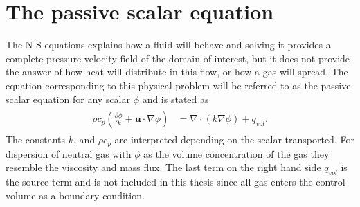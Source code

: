 


\section{The passive scalar equation}
The N-S equations explains how a fluid will behave and solving it provides a complete pressure-velocity field of the 
domain of interest, but it does not provide the answer of how heat will distribute in this flow, or how a gas will spread.
The equation corresponding to this physical problem will be referred to as the passive scalar equation for any scalar 
$\phi$ and is stated as 
\begin{align}
    \begin{split}
        \rho c_p(\frac{\partial \phi}{\partial t} + \mathbf{u}\cdot \nabla\phi) 
        &= \nabla \cdot(k\nabla \phi)+ q_{vol}. 
    \end{split}
	\label{eq:PS}
\end{align}
The constants $k$, and $\rho c_p$ are interpreted depending on 
the scalar transported. For dispersion of neutral gas with $\phi$ as the volume concentration of the gas
they resemble the viscosity and mass flux. The last term on the right hand side $q_{vol}$ is the source term and is not 
included in this thesis since all gas enters the control volume as a boundary condition.

